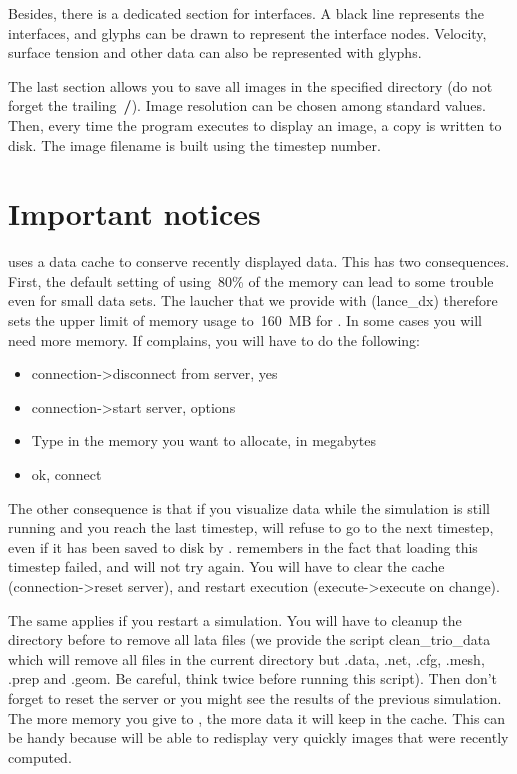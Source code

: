 \documentclass[a4paper,10pt,dvips]{article}
\begin{document}
Besides, there is a dedicated section for interfaces. A black line represents
the interfaces, and glyphs can be drawn to represent the interface nodes.
Velocity, surface tension and other data can also be represented with
glyphs. 

The last section allows you to save all images in the specified directory
(do not forget the trailing~\textbf{/}). Image resolution can be chosen
among standard values. Then, every time the program executes to display
an image, a copy is written to disk. The image filename is built using the
timestep number. 

\section{Important notices}

\opendx uses a data cache to conserve recently displayed data. This has two
consequences. First, the default setting of using~80\% of the memory can
lead to some trouble even for small data sets. The laucher that we provide
with \triou (\textsf{lance\_dx}) therefore sets the upper limit of memory usage to~160~MB for
\opendx. In some cases you will need more memory. If \opendx complains,
you will have to do the following:
\begin{itemize}
\item{\textsf{connection->disconnect from server, yes}}
\item{\textsf{connection->start server, options}}
\item{Type in the memory you want \opendx to allocate, in megabytes}
\item{\textsf{ok, connect}}
\end{itemize}
The other consequence is that if you visualize data while the simulation is still
running and you reach the last timestep, \opendx will refuse to go to the
next timestep, even if it has been saved to disk by \triou. \opendx remembers in
the fact that loading this timestep failed, and will not try again.
You will have to clear the cache (\textsf{connection->reset server}), and restart
execution (\textsf{execute->execute on change}).

The same applies if you restart a simulation. You will have to cleanup the directory
before to remove all \textsf{lata} files (we provide the script \textsf{clean\_trio\_data}
which will remove all files in the current directory but \textsf{.data}, 
\textsf{.net}, \textsf{.cfg}, \textsf{.mesh}, \textsf{.prep} and \textsf{.geom}. Be
careful, think twice before running this script). Then don't forget to reset the server
or you might see the results of the previous simulation. The more memory you
give to \opendx, the more data it will keep in the cache. This can be handy
because \opendx will be able to redisplay very quickly images that were recently
computed.
\end{document}
